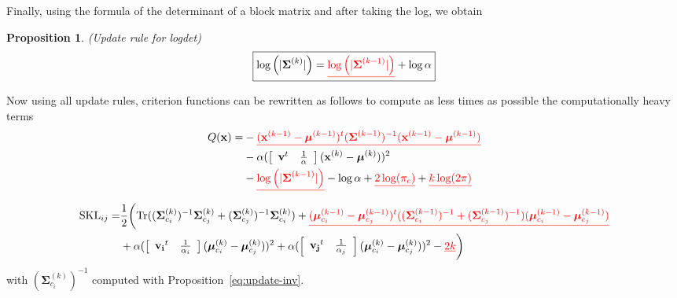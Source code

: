 \documentclass[a4paper,11pt,DIV=16]{scrartcl}
\newcommand*{\equl}[2]{%
    \textcolor{#1}{\underline{#2}}%
}
\newtheorem{prop}{Proposition}
\begin{document}
        Finally, using the formula of the determinant of a block matrix and after taking the log, we obtain
        \begin{prop}
        \label{eq:update-log}
            (Update rule for logdet)
            \begin{equation*}
                \fbox{$\log \left(|\boldsymbol{\Sigma}^{(k)}|\right) = \equl{red}{\log \left(|\boldsymbol{\Sigma}^{(k-1)}|\right)} + \log \alpha$}
            \end{equation*}
        \end{prop}

        Now using all update rules, criterion functions can be rewritten  as follows to compute as less times as possible the computationally heavy terms
        \begin{align*}
            Q(\mathbf{x}) = &- \equl{red}{(\mathbf{x}^{(k-1)} - \boldsymbol{\mu}^{(k-1)})^t (\boldsymbol{\Sigma}^{(k-1)})^{-1} (\mathbf{x}^{(k-1)} - \boldsymbol{\mu}^{(k-1)})} \\
            &- \alpha ( \left[\begin{array}{cc} \mathbf{v}^t & \frac{1}{\alpha} \end{array}\right] (\mathbf{x}^{(k)} - \boldsymbol{\mu}^{(k)}) )^2 \\
            &- \equl{red}{\log \left(|\boldsymbol{\Sigma}^{(k-1)}|\right)} - \log \alpha  + \equl{red}{2 \log (\pi_c)} + \equl{red}{k \log(2 \pi)}
        \end{align*}

        \begin{align*}
            \text{SKL}_{ij} = &\frac{1}{2} \biggl( \text{Tr} ((\boldsymbol{\Sigma}_{c_i}^{(k)})^{-1} \boldsymbol{\Sigma}_{c_j}^{(k)} + (\boldsymbol{\Sigma}_{c_j}^{(k)})^{-1} \boldsymbol{\Sigma}_{c_i}^{(k)})
            + \equl{red}{(\boldsymbol{\mu}_{c_i}^{(k-1)} - \boldsymbol{\mu}_{c_j}^{(k-1)})^t ((\boldsymbol{\Sigma}_{c_i}^{(k-1)})^{-1} + (\boldsymbol{\Sigma}_{c_j}^{(k-1)})^{-1}) (\boldsymbol{\mu}_{c_i}^{(k-1)} - \boldsymbol{\mu}_{c_j}^{(k-1)})} \\
            &+ \alpha ( \left[\begin{array}{cc} \mathbf{v_i}^t & \frac{1}{\alpha_i} \end{array}\right] (\boldsymbol{\mu}_{c_i}^{(k)} - \boldsymbol{\mu}_{c_j}^{(k)}) )^2
            + \alpha ( \left[\begin{array}{cc} \mathbf{v_j}^t & \frac{1}{\alpha_j} \end{array}\right] (\boldsymbol{\mu}_{c_i}^{(k)} - \boldsymbol{\mu}_{c_j}^{(k)}) )^2
            - \equl{red}{2k} \biggr)
        \end{align*}
        with $(\boldsymbol{\Sigma}_{c_i}^{(k)})^{-1}$ computed with Proposition~\ref{eq:update-inv}.
\end{document}
